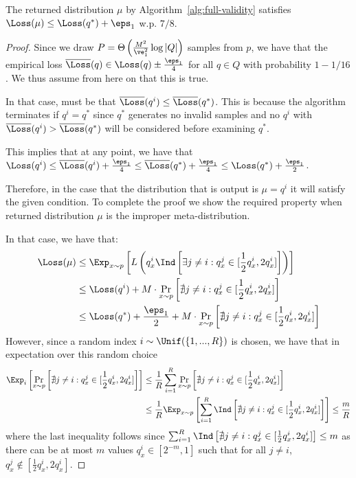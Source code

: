 \begin{lemma}\label{lem:full-validity-loss}
The returned distribution $\mu$ by Algorithm~\ref{alg:full-validity} satisfies $\Loss(\mu) \le \Loss(q^*) + \eps_1$ w.p. $7/8$.
\end{lemma}
\begin{proof}
  Since we draw $P=\Theta\left(\frac{M^2}{\ve_1^2} \log |Q| \right)$ samples from $p$, we have that the empirical loss $\overline \Loss(q) \in \Loss(q) \pm \frac {\eps_1} 4$ for all $q \in Q$ with probability $1-1/16$. We thus assume from here on that this is true.
  
  In that case, must be that $\overline \Loss(q^i) \le \overline \Loss(q^*)$. This is because the algorithm terminates if $q^i = q^*$ since $q^*$ generates no invalid samples and no $q^i$ with $\overline \Loss(q^i) > \overline \Loss(q^*)$ will be considered before examining $q^*$.
  
  This implies that at any point, we have that $\Loss(q^i) \le \overline \Loss(q^i) + \frac {\eps_1} 4 \le \overline \Loss(q^*) + \frac {\eps_1} 4 \le \Loss(q^*) + \frac {\eps_1} 2$. 
  
  Therefore, in the case that the distribution that is output is $\mu = q^i$ it will satisfy the given condition.
  To complete the proof we show the required property when returned distribution $\mu$ is the improper meta-distribution.
  
  In that case, we have that:
    \begin{align*}
      \Loss(\mu) 
  &\le \Exp_{x\sim p}\left[ L\left(q_x^i \Ind\left[\exists j \neq i: q^j_x \in [\frac12 q^i_x,2 q^i_x] \right] \right) \right] \\
  &\le \Loss(q^i) + M \cdot \Pr_{x\sim p}\left[ \nexists j \neq i: q^j_x \in [\frac12 q^i_x,2 q^i_x] \right] \\
  &\le \Loss(q^*) + \frac {\eps_1} 2 + M \cdot \Pr_{x\sim p}\left[ \nexists j \neq i: q^j_x \in [\frac12 q^i_x,2 q^i_x] \right]
    \end{align*}
However, since a random index $i \sim \Unif(\{1,...,R\})$ is chosen, we have that in expectation over this random choice
    \begin{align*}
\Exp_i\left[ \Pr_{x\sim p}\left[ \nexists j \neq i: q^j_x \in [\frac12 q^i_x,2 q^i_x] \right] \right] 
&\le \frac 1 R \sum_{i=1}^R \Pr_{x\sim p}\left[ \nexists j \neq i: q^j_x \in [\frac12 q^i_x,2 q^i_x] \right] \\
&\le \frac 1 R \Exp_{x\sim p} \left[ \sum_{i=1}^R \Ind\left[ \nexists j \neq i: q^j_x \in [\frac12 q^i_x,2 q^i_x] \right] \right] 
\le \frac m R
   \end{align*}
  where the last inequality follows since $\sum_{i=1}^R \Ind\left[ \nexists j \neq i: q^j_x \in [\frac12 q^i_x,2 q^i_x] \right] \le m $ as there can be at most $m$ values $q^i_x \in [2^{-m},1]$ such that for all $j \neq i$, $q^j_x \notin [\frac12 q^i_x,2 q^i_x]$.


\end{proof}
